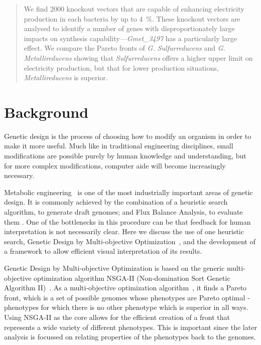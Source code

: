 \documentclass[a4paper]{article}
\begin{document}
\begin{abstract}
\begin{description}
We find 2000 knockout vectors that are capable of enhancing electricity production in each bacteria by up to \SI{4}{\percent}. These knockout vectors are analysed to identify a number of genes with disproportionately large impacts on synthesis capability---{\it Gmet\_3497} has a particularly large effect. We compare the Pareto fronts of {\it G. Sulfurreducens} and {\it G. Metallireducens} showing that {\it Sulfurreducens} offers a higher upper limit on electricity production, but that for lower production situations, {\it Metallireducens} is superior.

\end{description}
\end{abstract}

\section{Background}

Genetic design is the process of choosing how to modify an organism in order to make it more useful. Much like in traditional engineering disciplines, small modifications are possible purely by human knowledge and understanding, but for more complex modifications, computer aide will become increasingly necessary.

Metabolic engineering~\cite{stephanopoulos1999metabolic} is one of the most industrially important areas of genetic design. It is commonly achieved by the combination of a heuristic search algorithm, to generate draft genomes; and Flux Balance Analysis, to evaluate them \cite{Orth2010}. One of the bottlenecks in this procedure can be that feedback for human interpretation is not necessarily clear. Here we discuss the use of one heuristic search, Genetic Design by Multi-objective Optimization~\cite{Costanza2012}, and the development of a framework to allow efficient visual interpretation of its results.

Genetic Design by Multi-objective Optimization is based on the generic multi-objective optimization algorithm NSGA-II (Non-domination Sort Genetic Algorithm II)~\cite{Deb2002a}. As a multi-objective optimization  algorithm~\cite{Gen2008}, it finds a Pareto front, which is a set of possible genomes whose phenotypes are Pareto optimal - phenotypes for which there is no other phenotype which is superior in all ways. Using NSGA-II as the core allows for the efficient creation of a front that represents a wide variety of different phenotypes. This is important since the later analysis is focussed on relating properties of the phenotypes back to the genomes.
\end{document}
